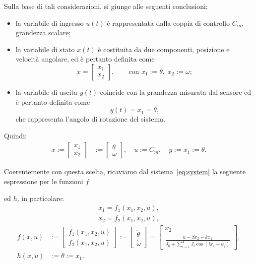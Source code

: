 \documentclass[a4paper, 11pt]{article}
\begin{document}
Sulla base di tali considerazioni, si giunge alle seguenti conclusioni:
\begin{itemize}
    \item la variabile di ingresso \(u(t)\) è rappresentata dalla coppia di controllo \(C_m\), grandezza scalare;
    \item la variabile di stato \(x(t)\) è costituita da due componenti, posizione e velocità angolare, ed è pertanto definita come
    \[
    x =
    \begin{bmatrix}
        x_1 \\
        x_2
    \end{bmatrix},
    \qquad
    \text{con } x_1 := \theta, \; x_2 := \omega;
    \]
    \item la variabile di uscita \(y(t)\) coincide con la grandezza misurata dal sensore ed è pertanto definita come
    \[
    y(t) = x_1 = \theta,
    \]
    che rappresenta l’angolo di rotazione del sistema.
\end{itemize}

Quindi:
%
\begin{align*}
	x := \begin{bmatrix}
		{x}_1
		\\
		{x}_2
	\end{bmatrix} &:= \begin{bmatrix}
	    \theta
        \\
        \omega
	\end{bmatrix}, \quad 
    u :=  C_{m}, \quad 
    y := x_1 := \theta .
\end{align*}
%

Coerentemente con questa scelta, ricaviamo dal sistema~\eqref{eq:system} la seguente espressione per le funzioni $f$ 

ed $h$, in particolare: 
%
\begin{align*}
\dot{x}_1 = f_1(x_1, x_2, u),
\\
\dot{x}_2 = f_2(x_1, x_2, u),
\end{align*}
%
%
\begin{align*}
	f(x,u) &:= \begin{bmatrix}
	   f_1(x_1, x_2,u)
       \\
   f_2(x_1, x_2,u)
	\end{bmatrix} := \begin{bmatrix}
	    \dot{\theta}
        \\
        \dot{\omega} 
	\end{bmatrix} = \begin{bmatrix}
	    x_{2}
        \\
        \frac{u - \beta x_{2} - kx_{1}}{J_0 + \sum_{i=1}^{4} J_i \cos(i x_1 + \psi_i)}
	\end{bmatrix},
	\\
	h(x,u) &:= \theta := x_1.
\end{align*}
%
\end{document}
